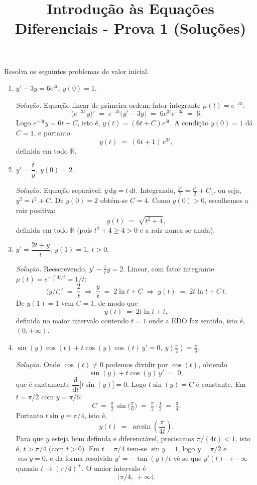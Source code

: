 \documentclass[10pt,a4paper]{amsart}
\title{Introdução às Equações Diferenciais - Prova 1 (Soluções)}
\newcommand{\R}{\mathbb{R}}
\renewcommand{\d}{\mathrm{d}}
\begin{document}
\maketitle

 Resolva os seguintes problemas de valor inicial.
\begin{enumerate}[label=(\alph*)]
    \item $y' - 3y = 6e^{3t}, \ y(0) = 1.$

    \emph{Solução.} Equação linear de primeira ordem; fator integrante $\mu(t) = e^{-3t}$:
    \[
        \bigl(e^{-3t}\, y\bigr)' \;=\; e^{-3t}\bigl(y' - 3y\bigr) \;=\; 6 e^{3t} e^{-3t} \;=\; 6.
    \]
    Logo $e^{-3t} y = 6t + C$, isto é, $y(t) = (6t + C) e^{3t}$. A condição $y(0) = 1$ dá $C = 1$, e portanto
    \[
        y(t) \;=\; (6t + 1)\, e^{3t},
    \]
    definida em todo $\R$.

    \item $y' = \dfrac{t}{y}, \ y(0) = 2.$

    \emph{Solução.} Equação separável: $y\,\d y = t\,\d t$. Integrando, $\tfrac{y^2}{2} = \tfrac{t^2}{2} + C_1$, ou seja, $y^2 = t^2 + C$. De $y(0) = 2$ obtém-se $C = 4$. Como $y(0) > 0$, escolhemos a raiz positiva:
    \[
        y(t) \;=\; \sqrt{t^2 + 4},
    \]
    definida em todo $\R$ (pois $t^2 + 4 \geq 4 > 0$ e a raiz nunca se anula).

    \item $y' = \dfrac{2t + y}{t}, \ y(1) = 1, \ t > 0.$

    \emph{Solução.} Reescrevendo, $y' - \tfrac{1}{t} y = 2$. Linear, com fator integrante $\mu(t) = e^{-\int \d t/t} = 1/t$:
    \[
        \bigl(y/t\bigr)' \;=\; \frac{2}{t} \;\Longrightarrow\; \frac{y}{t} \;=\; 2 \ln t + C \;\Longrightarrow\; y(t) \;=\; 2 t \ln t + C\, t.
    \]
    De $y(1) = 1$ vem $C = 1$, de modo que
    \[
        y(t) \;=\; 2 t \ln t + t,
    \]
    definida no maior intervalo contendo $t = 1$ onde a EDO faz sentido, isto é, $(0, +\infty)$.

    \item $\sin(y) \cos(t) + t \cos(y) \cos(t)\, y' = 0, \ y\!\left(\tfrac{\pi}{2}\right) = \tfrac{\pi}{6}.$

    \emph{Solução.} Onde $\cos(t) \neq 0$ podemos dividir por $\cos(t)$, obtendo
    \[
        \sin(y) + t \cos(y)\, y' \;=\; 0,
    \]
    que é exatamente $\dfrac{\d}{\d t}\bigl[t \sin(y)\bigr] = 0$. Logo $t \sin(y) = C$ é constante. Em $t = \pi/2$ com $y = \pi/6$:
    \[
        C \;=\; \tfrac{\pi}{2}\, \sin\!\bigl(\tfrac{\pi}{6}\bigr) \;=\; \tfrac{\pi}{2} \cdot \tfrac{1}{2} \;=\; \tfrac{\pi}{4}.
    \]
    Portanto $t \sin y = \pi/4$, isto é,
    \[
        y(t) \;=\; \arcsin\!\left( \frac{\pi}{4 t} \right).
    \]
    Para que $y$ esteja bem definida e diferenciável, precisamos $\pi/(4t) < 1$, isto é, $t > \pi/4$ (com $t > 0$). Em $t = \pi/4$ tem-se $\sin y = 1$, logo $y = \pi/2$ e $\cos y = 0$, e da forma resolvida $y' = -\tan(y)/t$ vê-se que $y'(t) \to -\infty$ quando $t \to (\pi/4)^+$. O maior intervalo é
    \[
        \bigl(\pi/4,\, +\infty\bigr).
    \]
\end{enumerate}
\end{document}
